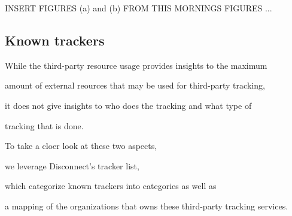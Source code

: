 \documentclass{sig-alternate-10pt}
\begin{document}

















INSERT FIGURES (a) and (b) FROM THIS MORNINGS FIGURES ...



\subsection{Known trackers}



While the third-party resource usage provides insights to the maximum

amount of external reources that may be used for third-party tracking,

it does not give insights to who does the tracking and what type of 

tracking that is done.

To take a cloer look at these two aspects,

we leverage Disconnect's tracker list,

which categorize known trackers into categories as well as 

a mapping of the organizations that owns these third-party tracking services.

\end{document}
